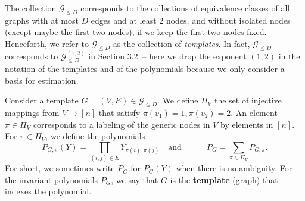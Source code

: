\documentclass[final]{colt2026}
\newcommand{\1}{\mathbf{1}}
\begin{document}
The collection $\mathcal{G}_{\leq D}$ corresponds to the collections of equivalence classes of all graphs with at most $D$ edges and at least $2$ nodes, and without isolated nodes (except maybe the first two nodes), if we keep the first two nodes fixed. Henceforth, we refer to $\mathcal{G}_{\leq D}$ as the collection of \emph{templates}. In fact, $\mathcal{G}_{\leq D}$ corresponds to $\mathcal{G}^{(1,2)}_{\leq D}$ in Section 3.2~\cite{CGGV25}-- here we drop the exponent $(1,2)$ in the notation of the templates and of the polynomials because we only consider a basis for estimation.  



Consider a template $G= (V,E)\in \mathcal{G}_{\leq D}$. We define $\Pi_V$ the set of injective mappings from $V\rightarrow [n]$ that satisfy  $\pi(v_1) = 1, \pi(v_2) = 2$. An element $\pi\in \Pi_V$ corresponds to a labeling of the generic nodes in $V$ by elements in $[n]$. For $\pi\in \Pi_V$, we define the polynomials
\begin{equation}\label{eq:definition:P_G}
P_{G,\pi}(Y)= \prod_{(i,j)\in E} Y_{\pi(i),\pi(j)} \quad \text{and}\quad \quad \quad P_G = \sum_{\pi\in \Pi_V} P_{G,\pi}.
\end{equation}
 For short, we sometimes write $P_G$ for $P_G(Y)$ when there is no ambiguity. For the invariant polynomials $P_G$, we say that $G$ is the {\bf template} (graph) that indexes the polynomial. 
\end{document}
